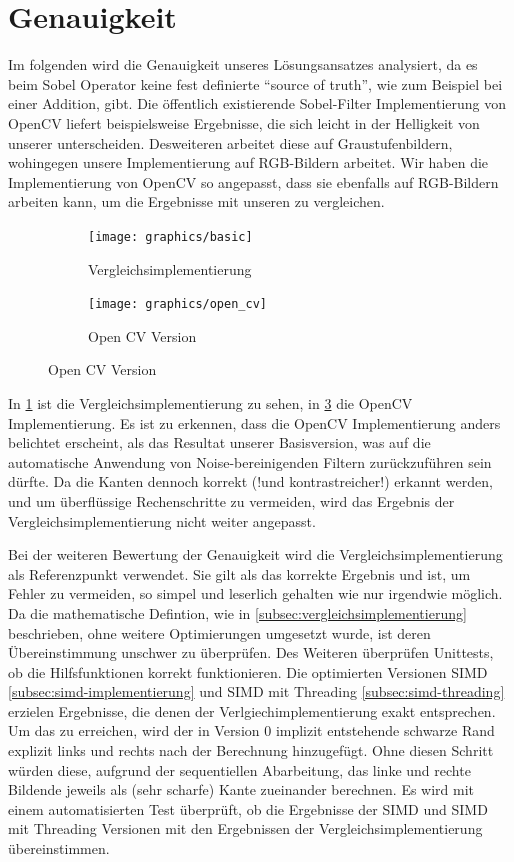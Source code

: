 \documentclass[course=erap]{aspdoc}
\begin{document}
\section{Genauigkeit}\label{sec:genauigkeit}
Im folgenden wird die Genauigkeit unseres Lösungsansatzes analysiert, da es beim Sobel Operator keine fest definierte \enquote{source of truth}, wie zum Beispiel bei einer Addition, gibt.
Die öffentlich existierende Sobel-Filter Implementierung von OpenCV liefert beispielsweise Ergebnisse, die sich leicht in der Helligkeit von unserer unterscheiden.
Desweiteren arbeitet diese auf Graustufenbildern, wohingegen unsere Implementierung auf RGB-Bildern arbeitet.
Wir haben die Implementierung von OpenCV\cite{sobelopencv} so angepasst, dass sie ebenfalls auf RGB-Bildern arbeiten kann, um die Ergebnisse mit unseren zu vergleichen.
\begin{figure}[H]
    \begin{subfigure}{.5\columnwidth}
        \centering
        \texttt{[image: graphics/basic]}
        \caption{Vergleichsimplementierung}
        \label{fig:basic}
    \end{subfigure}
    \begin{subfigure}{.5\columnwidth}
        \centering
        \texttt{[image: graphics/open\_cv]}
        \caption{Open CV Version}
        \label{fig:opencv}
    \end{subfigure}
\end{figure}
In \ref{fig:basic} ist die Vergleichsimplementierung zu sehen, in \ref{fig:opencv} die OpenCV Implementierung.
Es ist zu erkennen, dass die OpenCV Implementierung anders belichtet erscheint, als das Resultat unserer Basisversion, was auf die automatische Anwendung von Noise-bereinigenden Filtern zurückzuführen sein dürfte.
Da die Kanten dennoch korrekt (!und kontrastreicher!) erkannt werden, und um überflüssige Rechenschritte zu vermeiden, wird das Ergebnis der Vergleichsimplementierung nicht weiter angepasst.

Bei der weiteren Bewertung der Genauigkeit wird die Vergleichsimplementierung als Referenzpunkt verwendet.
Sie gilt als das korrekte Ergebnis und ist, um Fehler zu vermeiden, so simpel und leserlich gehalten wie nur irgendwie möglich.
Da die mathematische Defintion, wie in \ref{subsec:vergleichsimplementierung} beschrieben, ohne weitere Optimierungen umgesetzt wurde, ist deren Übereinstimmung unschwer zu überprüfen.
Des Weiteren überprüfen Unittests, ob die Hilfsfunktionen korrekt funktionieren.
Die optimierten Versionen SIMD \ref{subsec:simd-implementierung} und SIMD mit Threading \ref{subsec:simd-threading} erzielen Ergebnisse, die denen der Verlgiechimplementierung exakt entsprechen.
Um das zu erreichen, wird der in Version 0 implizit entstehende schwarze Rand explizit links und rechts nach der Berechnung hinzugefügt.
Ohne diesen Schritt würden diese, aufgrund der sequentiellen Abarbeitung, das linke und rechte Bildende jeweils als (sehr scharfe) Kante zueinander berechnen.
Es wird mit einem automatisierten Test überprüft, ob die Ergebnisse der SIMD und SIMD mit Threading Versionen mit den Ergebnissen der Vergleichsimplementierung übereinstimmen.
\end{document}
